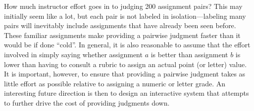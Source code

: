 How much instructor effort goes in to judging 200 assignment pairs? This
may initially seem like a lot, but each pair is not labeled in
isolation---labeling many pairs will inevitably include assignments that
have already been seen before. These familiar assignments make providing a
pairwise judgment faster than it would be if done ``cold''. In general, it
is also reasonable to assume that the effort involved in simply saying
whether assignment $a$ is better than assignment $b$ is lower than having
to consult a rubric to assign an actual point (or letter) value. It is
important, however, to ensure that providing a pairwise judgment takes as
little effort as possible relative to assigning a numeric or letter grade.
An interesting future direction is then to design an interactive system
that attempts to further drive the cost of providing judgments down.

